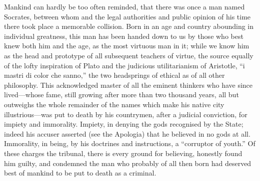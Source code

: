 \documentclass[11pt,openany]{book}
\begin{document}
Mankind can hardly be too often reminded, that there was once a man named Socrates, between whom and the legal authorities and public opinion of his time there took place a memorable collision. Born in an age and country abounding in individual greatness, this man has been handed down to us by those who best knew both him and the age, as the most virtuous man in it; while we know him as the head and prototype of all subsequent teachers of virtue, the source equally of the lofty inspiration of Plato and the judicious utilitarianism of Aristotle, ``i mastri di color che sanno,'' the two headsprings of ethical as of all other philosophy. This acknowledged master of all the eminent thinkers who have since lived---whose fame, still growing after more than two thousand years, all but outweighs the whole remainder of the names which make his native city illustrious---was put to death by his countrymen, after a judicial conviction, for impiety and immorality. Impiety, in denying the gods recognised by the State; indeed his accuser asserted (see the Apologia) that he believed in no gods at all. Immorality, in being, by his doctrines and instructions, a ``corruptor of youth.'' Of these charges the tribunal, there is every ground for believing, honestly found him guilty, and condemned the man who probably of all then born had deserved best of mankind to be put to death as a criminal.
\end{document}
